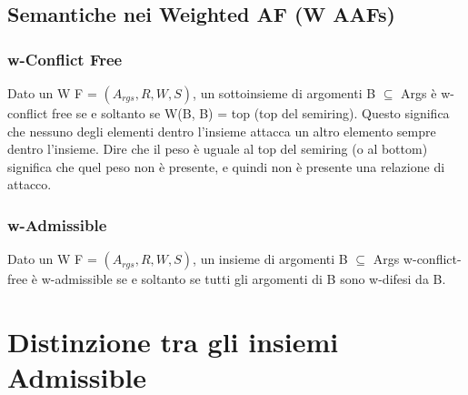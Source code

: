     \subsection{Semantiche nei Weighted AF (W AAFs)}
    \subsubsection{w-Conflict Free}
    Dato un W F = $(A_{rgs} , R, W, S)$, un sottoinsieme di argomenti B
$\subseteq$ Args è w-conflict free se e soltanto se W(B, B) = top (top del
    semiring). Questo significa che nessuno degli elementi dentro l'insieme
    attacca un altro elemento sempre dentro l'insieme. Dire che il peso è uguale
    al top del semiring (o al bottom) significa che quel peso non è presente, e
    quindi non è presente una relazione di attacco.
    \subsubsection{w-Admissible}
    Dato un W F = $(A_{rgs} , R, W, S)$, un insieme di argomenti B $\subseteq$
    Args w-conflict-free è w-admissible se e soltanto se tutti gli argomenti di
    B sono w-difesi da B.
    \section{Distinzione tra gli insiemi Admissible}
